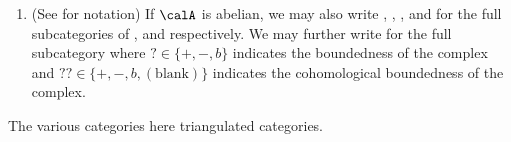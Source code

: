 \begin{definition}
\begin{enumerate}
    \item (See \cite[Cat\'egories d\'eriv\'ees Chapitre 1 2-3]{SGA4_5} for notation) If $\calA$ is abelian, we may also write , , , and  for the full subcategories of , and  respectively. We may further write  for the full subcategory where $? \in \{+,-,b\}$ indicates the boundedness of the complex and $?? \in \{+,-,b,(\text{blank})\}$ indicates the cohomological boundedness of the complex.
    
\end{enumerate}
The various categories here  triangulated categories.
\end{definition}



